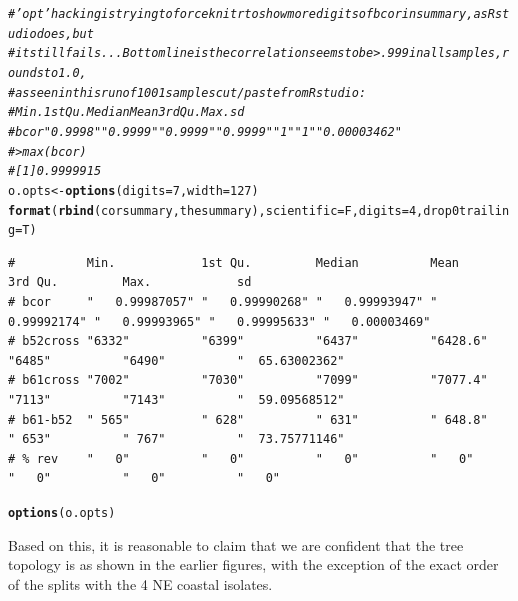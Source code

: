 \documentclass{article}\usepackage[]{graphicx}\usepackage[]{color}
\makeatletter
\newcommand{\hlnum}[1]{\textcolor[rgb]{0.686,0.059,0.569}{#1}}%
\newcommand{\hlcom}[1]{\textcolor[rgb]{0.678,0.584,0.686}{\textit{#1}}}%
\newcommand{\hlstd}[1]{\textcolor[rgb]{0.345,0.345,0.345}{#1}}%
\newcommand{\hlkwb}[1]{\textcolor[rgb]{0.69,0.353,0.396}{#1}}%
\newcommand{\hlkwc}[1]{\textcolor[rgb]{0.333,0.667,0.333}{#1}}%
\newcommand{\hlkwd}[1]{\textcolor[rgb]{0.737,0.353,0.396}{\textbf{#1}}}%
\newenvironment{kframe}{%
 \def\at@end@of@kframe{}%
 \ifinner\ifhmode%
  \def\at@end@of@kframe{\end{minipage}}%
  \begin{minipage}{\columnwidth}%
 \fi\fi%
 \def\FrameCommand##1{\hskip\@totalleftmargin \hskip-\fboxsep
 \colorbox{shadecolor}{##1}\hskip-\fboxsep
     \hskip-\linewidth \hskip-\@totalleftmargin \hskip\columnwidth}%
 \MakeFramed {\advance\hsize-\width
   \@totalleftmargin\z@ \linewidth\hsize
   \@setminipage}}%
 {\par\unskip\endMakeFramed%
 \at@end@of@kframe}
\newenvironment{knitrout}{}{} %
\makeatother
\begin{document}
\begin{knitrout}\footnotesize
{}\color{fgcolor}\begin{kframe}
\begin{alltt}
\hlcom{# 'opt' hacking is trying to force knitr to show more digits of bcor in summary, as Rstudio does, but}
\hlcom{# it still fails...  Bottom line is the correlation seems to be  > .999 in all samples, rounds to 1.0,}
\hlcom{# as seen in this run of 1001 samples cut/paste from Rstudio:}
\hlcom{#          Min.        1st Qu.     Median      Mean        3rd Qu. Max.   sd             }
\hlcom{# bcor     "   0.9998" "   0.9999" "   0.9999" "   0.9999" "   1"  "   1" "   0.00003462"}
\hlcom{# > max(bcor)}
\hlcom{# [1] 0.9999915}
\hlstd{o.opts} \hlkwb{<-} \hlkwd{options}\hlstd{(}\hlkwc{digits}\hlstd{=}\hlnum{7}\hlstd{,}\hlkwc{width}\hlstd{=}\hlnum{127}\hlstd{)}
\hlkwd{format}\hlstd{(}\hlkwd{rbind}\hlstd{(corsummary,thesummary),}\hlkwc{scientific}\hlstd{=F,}\hlkwc{digits}\hlstd{=}\hlnum{4}\hlstd{,}\hlkwc{drop0trailing}\hlstd{=T)}
\end{alltt}
\begin{verbatim}
#          Min.            1st Qu.         Median          Mean            3rd Qu.         Max.            sd             
# bcor     "   0.99987057" "   0.99990268" "   0.99993947" "   0.99992174" "   0.99993965" "   0.99995633" "   0.00003469"
# b52cross "6332"          "6399"          "6437"          "6428.6"        "6485"          "6490"          "  65.63002362"
# b61cross "7002"          "7030"          "7099"          "7077.4"        "7113"          "7143"          "  59.09568512"
# b61-b52  " 565"          " 628"          " 631"          " 648.8"        " 653"          " 767"          "  73.75771146"
# % rev    "   0"          "   0"          "   0"          "   0"          "   0"          "   0"          "   0"
\end{verbatim}
\begin{alltt}
\hlkwd{options}\hlstd{(o.opts)}
\end{alltt}
\end{kframe}
\end{knitrout}

Based on this, it is reasonable to claim that we are confident that the tree topology is as shown in the earlier
figures, with the exception of the exact order of the splits with the 4 NE coastal isolates.

\end{document}
